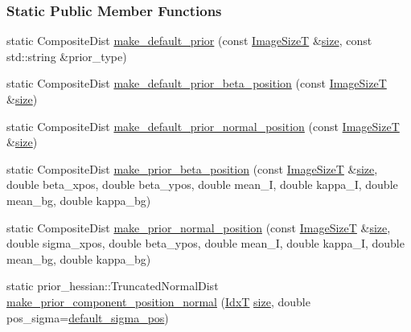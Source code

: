 \subsubsection*{Static Public Member Functions}
\begin{DoxyCompactItemize}
\item 
static Composite\+Dist \hyperlink{classmappel_1_1Gauss2DModel_a47f4b70d887066e1d73c0544e0a9690c}{make\+\_\+default\+\_\+prior} (const \hyperlink{classmappel_1_1ImageFormat2DBase_a49cccf61eb2a768a202634d27fcd81d5}{Image\+SizeT} \&\hyperlink{classmappel_1_1ImageFormat2DBase_a3be77d2aa6ec9f3815322732950c2a60}{size}, const std\+::string \&prior\+\_\+type)
\item 
static Composite\+Dist \hyperlink{classmappel_1_1Gauss2DModel_a47208116565b1960bc0bd84ee91dee1d}{make\+\_\+default\+\_\+prior\+\_\+beta\+\_\+position} (const \hyperlink{classmappel_1_1ImageFormat2DBase_a49cccf61eb2a768a202634d27fcd81d5}{Image\+SizeT} \&\hyperlink{classmappel_1_1ImageFormat2DBase_a3be77d2aa6ec9f3815322732950c2a60}{size})
\item 
static Composite\+Dist \hyperlink{classmappel_1_1Gauss2DModel_a22735422ebc24803eb51f2be72a67009}{make\+\_\+default\+\_\+prior\+\_\+normal\+\_\+position} (const \hyperlink{classmappel_1_1ImageFormat2DBase_a49cccf61eb2a768a202634d27fcd81d5}{Image\+SizeT} \&\hyperlink{classmappel_1_1ImageFormat2DBase_a3be77d2aa6ec9f3815322732950c2a60}{size})
\item 
static Composite\+Dist \hyperlink{classmappel_1_1Gauss2DModel_a78470247a902315915ad8af1770ea466}{make\+\_\+prior\+\_\+beta\+\_\+position} (const \hyperlink{classmappel_1_1ImageFormat2DBase_a49cccf61eb2a768a202634d27fcd81d5}{Image\+SizeT} \&\hyperlink{classmappel_1_1ImageFormat2DBase_a3be77d2aa6ec9f3815322732950c2a60}{size}, double beta\+\_\+xpos, double beta\+\_\+ypos, double mean\+\_\+I, double kappa\+\_\+I, double mean\+\_\+bg, double kappa\+\_\+bg)
\item 
static Composite\+Dist \hyperlink{classmappel_1_1Gauss2DModel_af60537cc3f45472202602e95d1e75f65}{make\+\_\+prior\+\_\+normal\+\_\+position} (const \hyperlink{classmappel_1_1ImageFormat2DBase_a49cccf61eb2a768a202634d27fcd81d5}{Image\+SizeT} \&\hyperlink{classmappel_1_1ImageFormat2DBase_a3be77d2aa6ec9f3815322732950c2a60}{size}, double sigma\+\_\+xpos, double beta\+\_\+ypos, double mean\+\_\+I, double kappa\+\_\+I, double mean\+\_\+bg, double kappa\+\_\+bg)
\item 
static prior\+\_\+hessian\+::\+Truncated\+Normal\+Dist \hyperlink{classmappel_1_1PointEmitterModel_ab99350cf74097c558f7a93b79e7a44c3}{make\+\_\+prior\+\_\+component\+\_\+position\+\_\+normal} (\hyperlink{namespacemappel_ab17ec0f30b61ece292439d7ece81d3a8}{IdxT} \hyperlink{classmappel_1_1ImageFormat2DBase_a3be77d2aa6ec9f3815322732950c2a60}{size}, double pos\+\_\+sigma=\hyperlink{classmappel_1_1PointEmitterModel_aa98a73b9e3937c00b07596d3928df3ca}{default\+\_\+sigma\+\_\+pos})

\end{DoxyCompactItemize}
